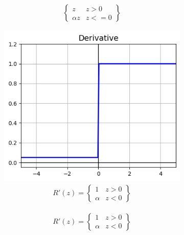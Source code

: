 \begin{itemize}
\begin{figure}[H]
\begin{subfigure}{0.5\textwidth}
{\begin{equation}
\begin{split}
                              \begin{Bmatrix}
                                  z        & z > 0  \\
                                  \alpha z & z <= 0
                              \end{Bmatrix}
                          \end{split}
                      \end{equation}
                  }
                  \label{fig:actfunc_leakyrelu}
              \end{subfigure}%
              \begin{subfigure}{0.5\textwidth}
                  \centering
                  \includegraphics[width=0.9\linewidth]{fig/actfunc_leakyrelu_der.png}
                  \caption{%
                      \begin{equation}
                          \begin{split}R'(z) =
                              \begin{Bmatrix}
                                  1      & z>0 \\
                                  \alpha & z<0
                              \end{Bmatrix}
                          \end{split}
                      \end{equation}
                  }
                  \label{fig:actfunc_leakyrelu_der}
              \end{subfigure}
          \end{figure}


\end{itemize}
